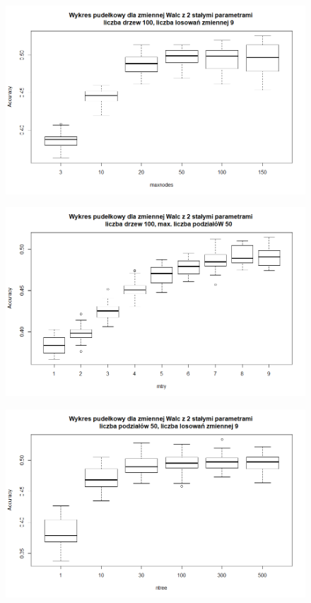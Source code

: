 \begin{figure}[h]
     \centering 
     \includegraphics[scale=0.60]{tex/boxplot_walc_maxnodes.png}
     \label{fig:classes}
\end{figure}

\begin{figure}[h]
     \centering 
     \includegraphics[scale=0.60]{tex/boxplot_walc_mtry.png}
     \label{fig:classes}
\end{figure}

\begin{figure}[h]
     \centering 
     \includegraphics[scale=0.60]{tex/boxplot_walc_ntree.png}
     \label{fig:classes}
\end{figure}

